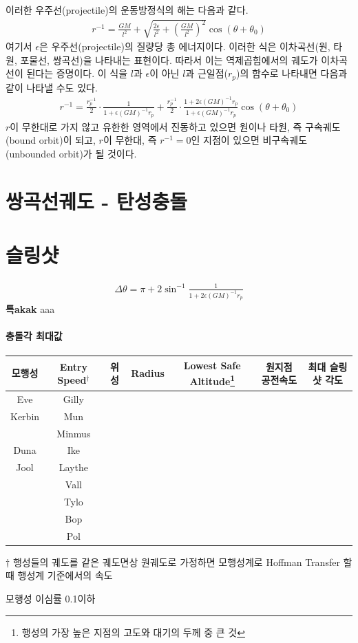 \documentclass[9pt]{amsbook}
\begin{document}
이러한 우주선(projectile)의 운동방정식의 해는 다음과 같다.
\begin{align}
	r^{-1} = \frac{GM}{l^2} + \sqrt{\frac{2\epsilon}{l^2}+\left(\frac{GM}{l^2}\right)^2}\cos(\theta+\theta_0)
\end{align}
여기서 $\epsilon$은 우주선(projectile)의 질량당 총 에너지이다. 이러한 식은 이차곡선(원, 타원, 포물선, 쌍곡선)을 나타내는 표현이다. 따라서 이는 역제곱힘에서의 궤도가 이차곡선이 된다는 증명이다.
이 식을 $l$과 $\epsilon$이 아닌 $l$과 근일점($r_p$)의 함수로 나타내면 다음과 같이 나타낼 수도 있다.
\begin{align}
	r^{-1} = \frac{r_p^{-1}}{2}\cdot\frac{1}{1+\epsilon (GM)^{-1}r_p} +\frac{r_p^{-1}}{2}\cdot\frac{1+2\epsilon (GM)^{-1}r_p}{1+\epsilon (GM)^{-1}r_p}\cos(\theta+\theta_0)
\end{align}
$r$이 무한대로 가지 않고 유한한 영역에서 진동하고 있으면 원이나 타원, 즉 구속궤도(bound orbit)이 되고, $r$이 무한대, 즉 $r^{-1}=0$인 지점이 있으면 비구속궤도(unbounded orbit)가 될 것이다.

\section{쌍곡선궤도 - 탄성충돌}
\section{슬링샷}

\begin{align}
	\Delta \theta = \pi + 2\sin^{-1}\frac{1}{{1+2\epsilon (GM)^{-1}r_p}}
\end{align}
\textbf{\textsf{\large 특akak}}\;\; aaa

\paragraph{충돌각 최대값}
\begin{center}
\begin{threeparttable}
\begin{tabular}{|c|c|c|c|c|c|c|}
모행성&Entry Speed$^\dagger$& 위성& Radius& Lowest Safe Altitude\footnote{행성의 가장 높은 지점의 고도와 대기의 두께 중 큰 것}&원지점 공전속도 &최대 슬링샷 각도
\\\hline
Eve&Gilly
\\\hline
Kerbin&Mun
\\&Minmus
\\\hline
Duna&Ike
\\\hline
Jool&Laythe
\\&Vall
\\&Tylo
\\&Bop
\\&Pol
\end{tabular}
\begin{tablenotes}
\item[$\dagger$] 행성들의 궤도를 같은 궤도면상 원궤도로 가정하면 모행성계로 Hoffman Transfer 할 때 행성계 기준에서의 속도
\end{tablenotes}
\end{threeparttable}
\end{center}
모행성 이심률 0.1이하
\end{document}
